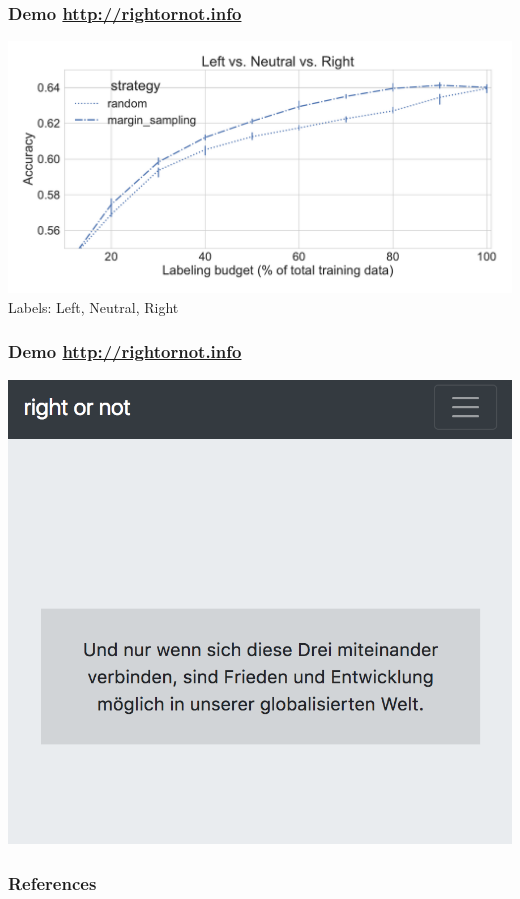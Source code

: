 \documentclass[]{beamer}
\begin{document}
\begin{frame}\frametitle{Demo \url{http://rightornot.info}}
\centering 
\includegraphics[width=.9\textwidth]{images/active_learning_manifesto-left-neutral-right}\\
Labels: Left, Neutral, Right
\end{frame}

\begin{frame}\frametitle{Demo \url{http://rightornot.info}}
\centering 
\includegraphics[width=.6\textwidth]{images/web-demo}\\
\end{frame}

\begin{frame}\frametitle{References}


\def\newblock{}
\vspace{2em}
 
\end{frame}
\end{document}
